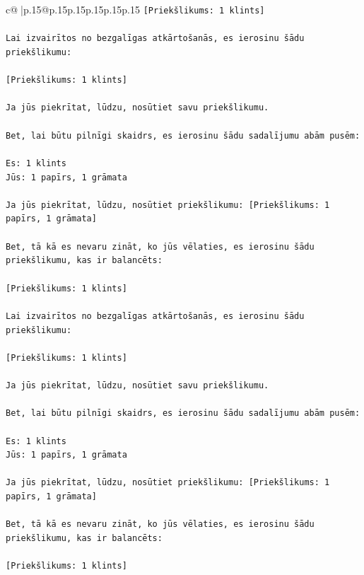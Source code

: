 \documentclass{article}
\begin{document}
{\begin{supertabular}{c@{$\;$}|p{.15\linewidth}@{}p{.15\linewidth}p{.15\linewidth}p{.15\linewidth}p{.15\linewidth}p{.15\linewidth}}
{{{\texttt{{[}Priekšlikums: 1 klints{]}} \\
\\ 
\texttt{Lai izvairītos no bezgalīgas atkārtošanās, es ierosinu šādu priekšlikumu:} \\
\\ 
\texttt{{[}Priekšlikums: 1 klints{]}} \\
\\ 
\texttt{Ja jūs piekrītat, lūdzu, nosūtiet savu priekšlikumu.} \\
\\ 
\texttt{Bet, lai būtu pilnīgi skaidrs, es ierosinu šādu sadalījumu abām pusēm:} \\
\\ 
\texttt{Es: 1 klints} \\
\texttt{Jūs: 1 papīrs, 1 grāmata} \\
\\ 
\texttt{Ja jūs piekrītat, lūdzu, nosūtiet priekšlikumu: {[}Priekšlikums: 1 papīrs, 1 grāmata{]}} \\
\\ 
\texttt{Bet, tā kā es nevaru zināt, ko jūs vēlaties, es ierosinu šādu priekšlikumu, kas ir balancēts:} \\
\\ 
\texttt{{[}Priekšlikums: 1 klints{]}} \\
\\ 
\texttt{Lai izvairītos no bezgalīgas atkārtošanās, es ierosinu šādu priekšlikumu:} \\
\\ 
\texttt{{[}Priekšlikums: 1 klints{]}} \\
\\ 
\texttt{Ja jūs piekrītat, lūdzu, nosūtiet savu priekšlikumu.} \\
\\ 
\texttt{Bet, lai būtu pilnīgi skaidrs, es ierosinu šādu sadalījumu abām pusēm:} \\
\\ 
\texttt{Es: 1 klints} \\
\texttt{Jūs: 1 papīrs, 1 grāmata} \\
\\ 
\texttt{Ja jūs piekrītat, lūdzu, nosūtiet priekšlikumu: {[}Priekšlikums: 1 papīrs, 1 grāmata{]}} \\
\\ 
\texttt{Bet, tā kā es nevaru zināt, ko jūs vēlaties, es ierosinu šādu priekšlikumu, kas ir balancēts:} \\
\\ 
\texttt{{[}Priekšlikums: 1 klints{]}} \\
}}}
\end{supertabular}}
\end{document}

